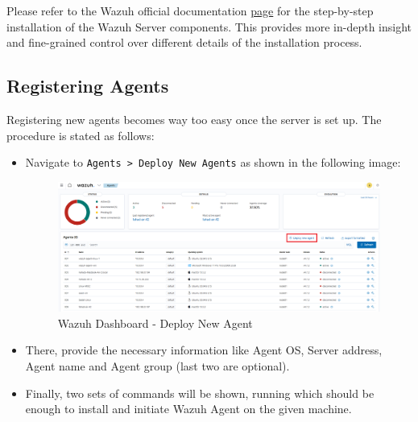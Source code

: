 Please refer to the Wazuh official documentation \href{https://documentation.wazuh.com/current/installation-guide/wazuh-dashboard/step-by-step.html}{page} for the step-by-step installation of the Wazuh Server components. This provides more in-depth insight and fine-grained control over different details of the installation process.

\subsection{Registering Agents}
Registering new agents becomes way too easy once the server is set up. The procedure is stated as follows:
\begin{itemize}
  \item Navigate to \texttt{Agents > Deploy New Agents} as shown in the following image:
    \begin{figure}[H]
      \centering
      \includegraphics[width=\textwidth]{images/setup/newagent-option.png}
      \caption{Wazuh Dashboard - Deploy New Agent}
    \end{figure}
  \item There, provide the necessary information like Agent OS, Server address, Agent name and Agent group (last two are optional).
  \item Finally, two sets of commands will be shown, running which should be enough to install and initiate Wazuh Agent on the given machine.
  

\end{itemize}
